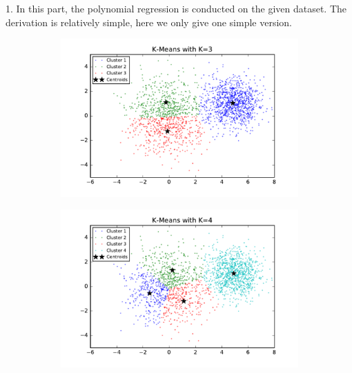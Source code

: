 \begin{description}

\item{1. }
In this part, the polynomial regression is conducted on the given dataset. The derivation is relatively simple, here we only give one simple version.

\begin{figure}[htb]
        \centering
        \begin{subfigure}[b]{0.475\textwidth}
            \centering
            \includegraphics[width=\textwidth]{./figures/clustering_kMeans_3.pdf}
        \end{subfigure}
        \hfill
        \begin{subfigure}[b]{0.475\textwidth}  
            \centering 
            \includegraphics[width=\textwidth]{./figures/clustering_kMeans_4.pdf}

\end{subfigure}
\end{figure}
\end{description}
